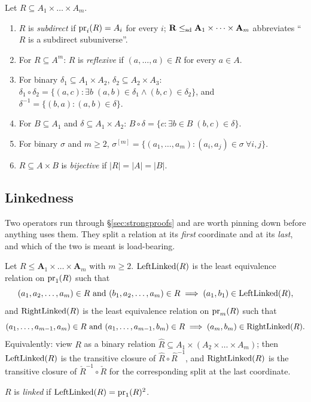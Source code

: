 \begin{definition}\label{def:rel-vocab}
Let $R\subseteq A_{1}\times\dots\times A_{m}$.
\begin{enumerate}\alphlabels\tightlist
\item $R$ is \emph{subdirect} if $\operatorname*{pr}_{i}(R)=A_{i}$ for every $i$;
  $\mathbf R\le_{\mathrm{sd}}\mathbf A_{1}\times\dots\times\mathbf A_{m}$ abbreviates
  ``$R$ is a subdirect subuniverse''.
\item For $R\subseteq A^{m}$: $R$ is \emph{reflexive} if
  $(a,\dots,a)\in R$ for every $a\in A$.
\item For binary $\delta_{1}\subseteq A_{1}\times A_{2}$,
  $\delta_{2}\subseteq A_{2}\times A_{3}$:
  $\delta_{1}\circ\delta_{2}=\{(a,c):\exists b\;(a,b)\in\delta_{1}\wedge
  (b,c)\in\delta_{2}\}$, and $\delta^{-1}=\{(b,a):(a,b)\in\delta\}$.
\item For $B\subseteq A_{1}$ and $\delta\subseteq A_{1}\times A_{2}$:
  $B\circ\delta=\{c:\exists b\in B\;(b,c)\in\delta\}$.
\item For binary $\sigma$ and $m\ge 2$,
  $\sigma^{[m]}=\{(a_{1},\dots,a_{m}):(a_{i},a_{j})\in\sigma\ \forall i,j\}$.
\item $R\subseteq A\times B$ is \emph{bijective} if $|R|=|A|=|B|$.
\end{enumerate}
\end{definition}

\subsection{Linkedness}\label{sec:linkedness}

Two operators run through \S\ref{sec:strongproofs} and are worth pinning down
before anything uses them. They split a relation at its \emph{first} coordinate
and at its \emph{last}, and which of the two is meant is load-bearing.

\begin{definition}\label{def:linked}
Let $R\le\mathbf A_{1}\times\dots\times\mathbf A_{m}$ with $m\ge2$.
$\operatorname{LeftLinked}(R)$ is the least equivalence relation on $\operatorname*{pr}_{1}(R)$ such that
\[
  (a_{1},a_{2},\dots,a_{m})\in R\ \text{and}\ (b_{1},a_{2},\dots,a_{m})\in R
  \;\Longrightarrow\;(a_{1},b_{1})\in\LeftLinked(R),
\]
and $\operatorname{RightLinked}(R)$ is the least equivalence relation on $\operatorname*{pr}_{m}(R)$ such
that
\[
  (a_{1},\dots,a_{m-1},a_{m})\in R\ \text{and}\
  (a_{1},\dots,a_{m-1},b_{m})\in R
  \;\Longrightarrow\;(a_{m},b_{m})\in\RightLinked(R).
\]
Equivalently: view $R$ as a binary relation
$\hat R\subseteq A_{1}\times(A_{2}\times\dots\times A_{m})$; then
$\operatorname{LeftLinked}(R)$ is the transitive closure of $\hat R\circ\hat R^{-1}$, and
$\operatorname{RightLinked}(R)$ is the transitive closure of $\check R^{-1}\circ\check R$
for the corresponding split at the last coordinate.

$R$ is \emph{linked} if $\operatorname{LeftLinked}(R)=\operatorname*{pr}_{1}(R)^{2}$.
\end{definition}

